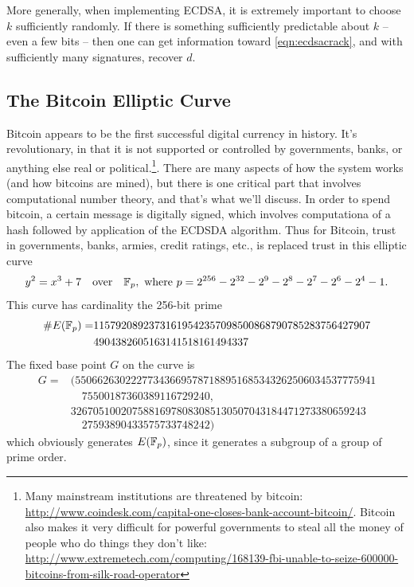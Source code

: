 \documentclass{book}
\begin{document}
More generally, when implementing ECDSA, it is extremely important to
choose $k$ sufficiently randomly.  If there is something sufficiently
predictable about $k$ -- even a few bits -- then one
can get information toward \eqref{eqn:ecdsacrack}, and with sufficiently
many signatures, recover $d$.


\subsection{The Bitcoin Elliptic Curve}




Bitcoin appears to be the first successful digital currency in history. It's
revolutionary, in that it is not supported or controlled by governments,
banks, or anything else real or political.\footnote{Many mainstream
institutions are threatened by bitcoin:\\ \url{http://www.coindesk.com/capital-one-closes-bank-account-bitcoin/}.  Bitcoin also makes it very difficult for powerful
governments to steal all the money of people who do things they don't like:  \url{http://www.extremetech.com/computing/168139-fbi-unable-to-seize-600000-bitcoins-from-silk-road-operator}}.
There are many aspects of how the
system works (and how bitcoins are mined), but there is one critical part that
involves computational number theory, and that's what we'll discuss.
In order to spend bitcoin, a certain message is digitally signed,
which involves computationa of a hash followed by application of the
ECDSDA algorithm.  Thus for Bitcoin, trust in governments, banks, armies,
credit ratings, etc., is replaced trust in this elliptic curve
$$
y^2 = x^3 + 7\quad\text{over}\quad \mathbb{F}_p,\,\,\text{where}\,\,
p=2^{256} - 2^{32} - 2^9 - 2^8 - 2^7 - 2^6 - 2^4 - 1.
$$
This curve has cardinality the 256-bit prime
\begin{align*}
\#E(\mathbb{F}_p) =& 11579208923731619542357098500868790785283756427907\\
& 4904382605163141518161494337
\end{align*}
The fixed base point $G$ on the curve is
\begin{align*}
G =& (550662630222773436695787188951685343262506034537775941\\
     & \quad 75500187360389116729240, \\
     & 32670510020758816978083085130507043184471273380659243\\
     & \quad 27593890433575733748242)
\end{align*}
which obviously generates $E(\mathbb{F}_p)$, since it generates a subgroup
of a group of prime order.
\end{document}
